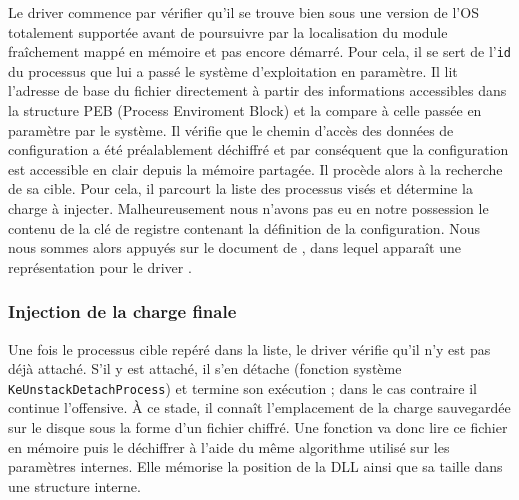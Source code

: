 Le driver commence par vérifier qu'il se trouve bien sous une version de l'OS totalement supportée avant de poursuivre par la localisation du module fraîchement mappé en mémoire et pas encore démarré. Pour cela, il se sert de l'\texttt{id} du processus que lui a passé le système d'exploitation en paramètre. Il lit l'adresse de base du fichier directement à partir des informations accessibles dans la structure PEB (Process Enviroment Block) et la compare à celle passée en paramètre par le système. Il vérifie que le chemin d'accès des données de configuration a été préalablement déchiffré et par conséquent que la configuration est accessible en clair depuis la mémoire partagée. Il procède alors à la recherche de sa cible. Pour cela, il parcourt la liste des processus visés et détermine la charge à injecter. Malheureusement nous n'avons pas eu en notre possession le contenu de la clé de registre contenant la définition de la configuration. Nous nous sommes alors appuyés sur le document de \Crysys, dans 
lequel 
apparaît une représentation pour le driver \jminet.

\subsubsection{Injection de la charge finale}


Une fois le processus cible repéré dans la liste, le driver vérifie qu'il n'y est pas déjà attaché. S'il y est attaché, il s'en détache (fonction système \texttt{KeUnstackDetachProcess}) et termine son exécution ; dans le cas contraire il continue l'offensive. À ce stade, il connaît l'emplacement de la charge sauvegardée sur le disque sous la forme d'un fichier chiffré. Une fonction va donc lire ce fichier en mémoire puis le déchiffrer à l'aide du même algorithme utilisé sur les paramètres internes. Elle mémorise la position de la DLL ainsi que sa taille dans une structure interne. 

